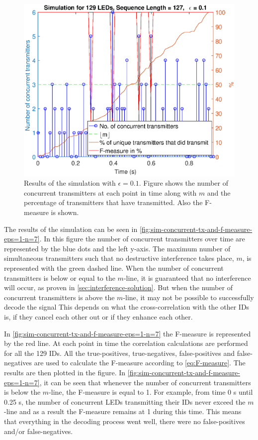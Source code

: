 \begin{figure}[ht]
	\centering
	\includegraphics[width=\textwidth]{chapters/evaluation-chapters/simulation/sim-concurrent-tx-and-f-measure-eps=1-n=7.eps}
	\caption{Results of the simulation with $\epsilon = 0.1$. Figure shows the number of concurrent transmitters at each point in time along with $m$ and the percentage of transmitters that have transmitted. Also the F-measure is shown.}
	\label{fig:sim-concurrent-tx-and-f-measure-eps=1-n=7}
\end{figure}



The results of the simulation can be seen in \autoref{fig:sim-concurrent-tx-and-f-measure-eps=1-n=7}.
In this figure the number of concurrent transmitters over time are represented by the blue dots and the left y-axis.
The maximum number of simultaneous transmitters such that no destructive interference takes place, $m$, is represented with the green dashed line.
When the number of concurrent transmitters is below or equal to the $m$-line, it is guaranteed that no interference will occur, as proven in \autoref{sec:interference-solution}.
But when the number of concurrent transmitters is above the $m$-line, it may not be possible to successfully decode the signal
This depends on what the cross-correlation with the other IDs is, if they cancel each other out or if they enhance each other.

In \autoref{fig:sim-concurrent-tx-and-f-measure-eps=1-n=7} the F-measure is represented by the red line.
At each point in time the correlation calculations are performed for all the 129 IDs.
All the true-positives, true-negatives, false-positives and false-negatives are used to calculate the F-measure according to \autoref{eq:F-measure}.
The results are then plotted in the figure.
In \autoref{fig:sim-concurrent-tx-and-f-measure-eps=1-n=7}, it can be seen that whenever the number of concurrent transmitters is below the $m$-line, the F-measure is equal to 1.
For example, from time 0 s until 0.25 s, the number of concurrent LEDs transmitting their IDs never exceed the $m$-line and as a result the F-measure remains at 1 during this time.
This means that everything in the decoding process went well, there were no false-positives and/or false-negatives.

